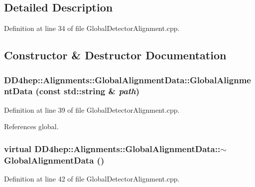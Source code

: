 \subsection{Detailed Description}


Definition at line 34 of file GlobalDetectorAlignment.cpp.

\subsection{Constructor \& Destructor Documentation}
\hypertarget{class_d_d4hep_1_1_alignments_1_1_global_alignment_data_a57af2014192d0c3f26c8b47b7963236a}{
\subsubsection[{GlobalAlignmentData}]{\setlength{\rightskip}{0pt plus 5cm}DD4hep::Alignments::GlobalAlignmentData::GlobalAlignmentData (const std::string \& {\em path})}}
\label{class_d_d4hep_1_1_alignments_1_1_global_alignment_data_a57af2014192d0c3f26c8b47b7963236a}


Definition at line 39 of file GlobalDetectorAlignment.cpp.

References global.\hypertarget{class_d_d4hep_1_1_alignments_1_1_global_alignment_data_aa835825012b4775e2cd9d6f286271533}{
\subsubsection[{$\sim$GlobalAlignmentData}]{\setlength{\rightskip}{0pt plus 5cm}virtual DD4hep::Alignments::GlobalAlignmentData::$\sim$GlobalAlignmentData ()}}
\label{class_d_d4hep_1_1_alignments_1_1_global_alignment_data_aa835825012b4775e2cd9d6f286271533}


Definition at line 42 of file GlobalDetectorAlignment.cpp.


